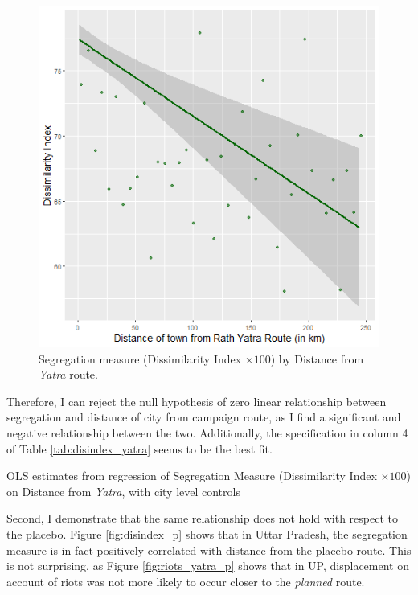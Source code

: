 \documentclass{article}
\begin{document}
\begin{figure}[H]
    \centering
    \includegraphics[scale = 0.6]{images/graph_disindex.png}
    \caption{Segregation measure (Dissimilarity Index $\times 100$) by Distance from \textit{Yatra} route.}
    \label{fig:disindex_yatra}
\end{figure}

Therefore, I can reject the null hypothesis of zero linear relationship between segregation and distance of city from campaign route, as I find a significant and negative relationship between the two. Additionally, the specification in column 4 of Table \ref{tab:disindex_yatra} seems to be the best fit. 

\begin{table}[H]
 \centering
\resizebox{\textwidth}{!}{
   
   }
    \caption{OLS estimates from regression of Segregation Measure (Dissimilarity Index $\times 100$) on Distance from \textit{Yatra}, with city level controls}
    \label{tab:disindex_yatra}
\end{table}

Second, I demonstrate that the same relationship does not hold with respect to the placebo. Figure \ref{fig:disindex_p} shows that in Uttar Pradesh, the segregation measure is in fact positively correlated with distance from the placebo route. This is not surprising, as Figure \ref{fig:riots_yatra_p} shows that in UP, displacement on account of riots was not more likely to occur closer to the \textit{planned} route.
\end{document}
